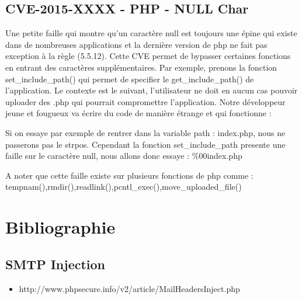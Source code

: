 \documentclass{article}
\begin{document}
\subsection{CVE-2015-XXXX - PHP - NULL Char}

Une petite faille qui montre qu'un caractère null est toujours une épine qui existe dans de nombreuses applications et la dernière version de php ne fait pas exception à la règle (5.5.12). Cette CVE permet de bypasser certaines fonctions en entrant des caractères supplémentaires. Par exemple, prenons la fonction set\_include\_path() qui permet de specifier le get\_include\_path() de l'application. Le contexte est le suivant, l'utilisateur ne doit en aucun cas pouvoir uploader des .php qui pourrait compromettre l'application. Notre développeur jeune et fougueux va écrire du code de manière étrange et qui fonctionne :
\vspace{0.2cm}\\
\vspace{0.2cm}

Si on essaye par exemple de rentrer dans la variable path : index.php, nous ne passerons pas le strpos. Cependant la fonction set\_include\_path presente une faille sur le caractère null, nous allons donc essaye : \%00index.php
\vspace{0.2cm}\\
\vspace{0.2cm}

A noter que cette faille existe sur plusieurs fonctions de php comme :\\ 

tempnam(),rmdir(),readlink(),pcntl\_exec(),move\_uploaded\_file()\\


\newpage
\section{Bibliographie}
\subsection{SMTP Injection}
\begin{itemize}
\item http://www.phpsecure.info/v2/article/MailHeadersInject.php
\end{itemize}
\end{document}
